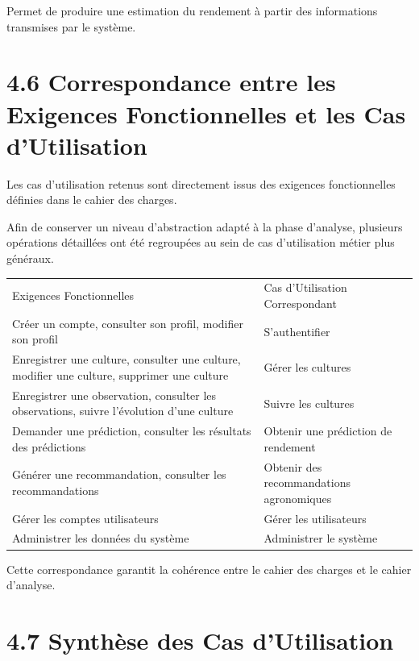 \documentclass[
]{book}
\begin{document}
Permet de produire une estimation du rendement à partir des informations
transmises par le système.

\hypertarget{correspondance-entre-les-exigences-fonctionnelles-et-les-cas-dutilisation}{%
\section{4.6 Correspondance entre les Exigences Fonctionnelles et les
Cas
d'Utilisation}\label{correspondance-entre-les-exigences-fonctionnelles-et-les-cas-dutilisation}}

Les cas d'utilisation retenus sont directement issus des exigences
fonctionnelles définies dans le cahier des charges.

Afin de conserver un niveau d'abstraction adapté à la phase d'analyse,
plusieurs opérations détaillées ont été regroupées au sein de cas
d'utilisation métier plus généraux.

\begin{longtable}[]{@{}ll@{}}
\toprule
\endhead
Exigences Fonctionnelles & Cas d'Utilisation Correspondant \\
Créer un compte, consulter son profil, modifier son profil &
S'authentifier \\
Enregistrer une culture, consulter une culture, modifier une culture,
supprimer une culture & Gérer les cultures \\
Enregistrer une observation, consulter les observations, suivre
l'évolution d'une culture & Suivre les cultures \\
Demander une prédiction, consulter les résultats des prédictions &
Obtenir une prédiction de rendement \\
Générer une recommandation, consulter les recommandations & Obtenir des
recommandations agronomiques \\
Gérer les comptes utilisateurs & Gérer les utilisateurs \\
Administrer les données du système & Administrer le système \\
\bottomrule
\end{longtable}

Cette correspondance garantit la cohérence entre le cahier des charges
et le cahier d'analyse.

\hypertarget{synthuxe8se-des-cas-dutilisation}{%
\section{4.7 Synthèse des Cas
d'Utilisation}\label{synthuxe8se-des-cas-dutilisation}}
\end{document}
